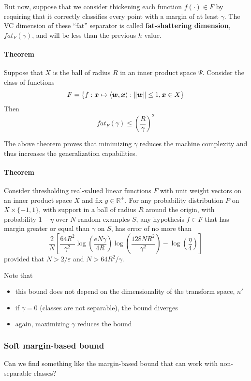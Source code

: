 \documentclass[oneside,onecolumn]{report}
\newcommand{\eps}{\varepsilon}
\newcommand{\inp}[2]{\left\langle #1, #2 \right\rangle}
\begin{document}
But now, suppose that we consider thickening each function $f(\cdot) \in F$ by requiring that it correctly classifies every point with a margin of at least $\gamma$.
The VC dimension of these ``fat'' separator is called \textbf{fat-shattering dimension}, $fat_F(\gamma)$, and will be less than the previous $h$ value.

\paragraph{Theorem}
Suppose that $X$ is the ball of radius $R$ in an inner product space $\Psi$.
Consider the class of functions
$$ F = \{ f: \bm x \mapsto \inp{\bm w}{\bm x} : \norm{\bm w} \leq 1, \bm x \in X\} $$
Then
$$ fat_F(\gamma) \leq \left( \frac{R}{\gamma} \right)^2 $$

The above theorem proves that minimizing $\gamma$ reduces the machine complexity and thus increases the generalization capabilities.

\paragraph{Theorem}
Consider thresholding real-valued linear functions $F$ with unit weight vectors on an inner product space $X$ and fix $y \in \mathbb R^+$.
For any probability distribution $P$ on $X \times \{-1, 1\}$, with support in a ball of radius $R$ around the origin, with probability $1 - \eta$ over $N$ random examples $S$, any hypothesis $f \in F$ that has margin greater or equal than $\gamma$ on $S$, has error of no more than
$$ \frac{2}{N} \left[ \frac{64 R^2}{\gamma^2} \log(\frac{e N \gamma}{4 R}) \log(\frac{128 N R^2}{\gamma^2}) - \log(\frac{\eta}{4}) \right] $$
provided that $N > 2/\eps$ and $N > 64 R^2 / \gamma$.

Note that
\begin{itemize}
    \item this bound does not depend on the dimensionality of the transform space, $n'$
    \item if $\gamma = 0$ (classes are not separable), the bound diverges
    \item again, maximizing $\gamma$ reduces the bound
\end{itemize}

\subsubsection{Soft margin-based bound}
Can we find something like the margin-based bound that can work with non-separable classes?
\end{document}

